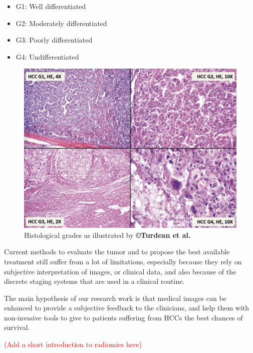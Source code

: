 \documentclass[]{article}
\begin{document}
\begin{itemize}
\item
  G1: Well differentiated
\item
  G2: Moderately differentiated
\item
  G3: Poorly differentiated
\item
  G4: Undifferentiated
\end{itemize}


\begin{figure}[th!]
\centering
\includegraphics[width=0.7\linewidth]{images/image7}
\caption{Histological grades as illustrated by \textbf{©Turdean et al. \cite{Turdean2012}}}
\label{HistologicalGrades}
\end{figure}


Current methods to evaluate the tumor and to propose the best available
treatment still suffer from a lot of limitations, especially because
they rely on subjective interpretation of images, or clinical data, and
also because of the discrete staging systems that are used in a clinical
routine.

The main hypothesis of our research work is that medical images can be
enhanced to provide a subjective feedback to the clinicians, and help
them with non-invasive tools to give to patients suffering from
HCCs the best chances of survival.

\textcolor{red}{(Add a short introduction to radiomics here)}


\newpage


\end{document}
